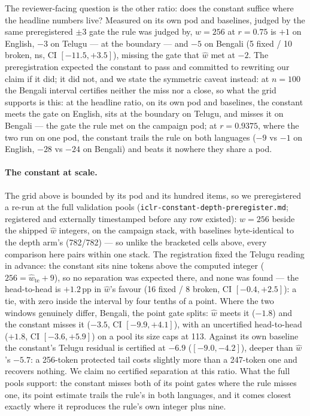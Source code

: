 \documentclass{article}
\begin{document}
The reviewer-facing question is the other ratio: does the constant
suffice where the headline numbers live? Measured on its own pod and
baselines, judged by the same preregistered $\pm 3$ gate the rule was
judged by, $w{=}256$ at $r{=}0.75$ is $+1$ on English, $-3$ on Telugu
--- at the boundary --- and $-5$ on Bengali (5 fixed / 10 broken, ns, CI
$[-11.5,+3.5]$), missing the gate that $\hat w$ met at $-2$. The
preregistration expected the constant to pass and committed to rewriting
our claim if it did; it did not, and we state the symmetric caveat
instead: at $n{=}100$ the Bengali interval certifies neither the miss nor
a close, so what the grid supports is this: at the headline
ratio, on its own pod and baselines, the constant meets the gate on
English, sits at the boundary on Telugu, and misses it on Bengali --- the
gate the rule met on the campaign pod; at $r{=}0.9375$, where the two run
on one pod, the constant trails the rule on both languages ($-9$ vs $-1$
on English, $-28$ vs $-24$ on Bengali) and beats it nowhere they share a
pod.

\paragraph{The constant at scale.}
The grid above is bounded by its pod and its hundred items, so we
preregistered a re-run at the full validation pools
(\texttt{iclr-constant-depth-preregister.md}; registered and externally
timestamped before any row existed): $w{=}256$ beside the shipped
$\hat w$ integers, on the campaign stack, with baselines byte-identical
to the depth arm's (782/782) --- so unlike the bracketed cells above,
every comparison here pairs within one stack.
The registration fixed the Telugu reading in advance: the constant sits
nine tokens above the computed integer ($256 = \hat w_{\mathrm{te}} + 9$),
so no separation was expected there, and none was found --- the
head-to-head is $+1.2$\,pp in $\hat w$'s favour (16 fixed / 8 broken,
CI $[-0.4, +2.5]$): a tie, with zero inside the interval by four tenths
of a point. Where the two windows genuinely differ, Bengali, the point gate
splits: $\hat w$ meets it ($-1.8$) and the constant misses it ($-3.5$,
CI $[-9.9, +4.1]$), with an uncertified head-to-head ($+1.8$,
CI $[-3.6, +5.9]$) on a pool its size caps at 113. Against its own
baseline the constant's Telugu residual is certified at $-6.9$
($[-9.0, -4.2]$), deeper than $\hat w$'s $-5.7$: a 256-token protected
tail costs slightly more than a 247-token one and recovers nothing. We
claim no certified separation at this ratio. What the full pools
support: the constant misses both of its point gates where the rule misses
one, its point estimate trails the rule's in both languages, and it
comes closest exactly where it reproduces the rule's own integer plus
nine.
\end{document}
